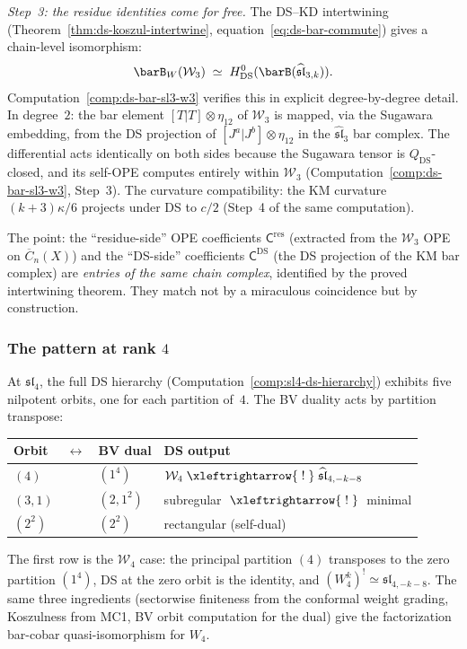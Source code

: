 \emph{Step~3: the residue identities come for free.}
The DS--KD intertwining
(Theorem~\ref{thm:ds-koszul-intertwine},
equation~\eqref{eq:ds-bar-commute}) gives a chain-level
isomorphism:
\[
\barB_W(\mathcal{W}_3) \;\simeq\;
H^0_{\mathrm{DS}}(\barB(\widehat{\mathfrak{sl}}_{3,k})).
\]
Computation~\ref{comp:ds-bar-sl3-w3} verifies this in explicit
degree-by-degree detail.  In degree~$2$: the bar element
$[T|T] \otimes \eta_{12}$ of $\mathcal{W}_3$ is mapped, via the
Sugawara embedding, from the DS projection of $[J^a|J^b] \otimes
\eta_{12}$ in the $\widehat{\mathfrak{sl}}_3$ bar complex.  The
differential acts identically on both sides because the Sugawara
tensor is $Q_{\mathrm{DS}}$-closed, and its self-OPE computes
entirely within $\mathcal{W}_3$
(Computation~\ref{comp:ds-bar-sl3-w3}, Step~3).  The curvature
compatibility: the KM curvature $(k+3)\kappa/6$ projects under DS
to $c/2$ (Step~4 of the same computation).

The point: the ``residue-side'' OPE coefficients
$\mathsf{C}^{\mathrm{res}}$ (extracted from the
$\mathcal{W}_3$ OPE on $\overline{C}_n(X)$) and the
``DS-side'' coefficients $\mathsf{C}^{\mathrm{DS}}$ (the DS
projection of the KM bar complex) are \emph{entries of the same
chain complex}, identified by the proved intertwining theorem.
They match not by a miraculous coincidence but by construction.

\subsubsection*{The pattern at rank $4$}

At $\mathfrak{sl}_4$, the full DS hierarchy
(Computation~\ref{comp:sl4-ds-hierarchy}) exhibits five nilpotent
orbits, one for each partition of~$4$.  The BV duality acts by
partition transpose:
\begin{center}
\renewcommand{\arraystretch}{1.1}
\begin{tabular}{lcl@{\qquad}l}
\textbf{Orbit} & $\longleftrightarrow$ &
\textbf{BV dual} & \textbf{DS output} \\
\hline
$(4)$ & & $(1^4)$ &
$\mathcal{W}_4 \;\xleftrightarrow{\;!\;}\;
\widehat{\mathfrak{sl}}_{4,-k-8}$ \\
$(3,1)$ & & $(2,1^2)$ &
subregular $\;\xleftrightarrow{\;!\;}\;$ minimal \\
$(2^2)$ & & $(2^2)$ &
rectangular (self-dual)
\end{tabular}
\end{center}
The first row is the $\mathcal{W}_4$ case: the principal partition
$(4)$ transposes to the zero partition $(1^4)$, DS at the zero
orbit is the identity, and $(W_4^k)^!
\simeq \widehat{\mathfrak{sl}}_{4,-k-8}$.
The same three ingredients (sectorwise finiteness from the conformal
weight grading, Koszulness from MC1, BV orbit computation for the
dual) give the factorization bar-cobar quasi-isomorphism for $W_4$.

